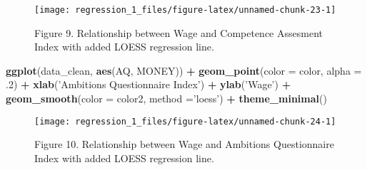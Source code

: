 \documentclass[]{article}
\newenvironment{Shaded}{\begin{snugshade}}{\end{snugshade}}
\newcommand{\DataTypeTok}[1]{\textcolor[rgb]{0.13,0.29,0.53}{#1}}
\newcommand{\FloatTok}[1]{\textcolor[rgb]{0.00,0.00,0.81}{#1}}
\newcommand{\KeywordTok}[1]{\textcolor[rgb]{0.13,0.29,0.53}{\textbf{#1}}}
\newcommand{\NormalTok}[1]{#1}
\newcommand{\OperatorTok}[1]{\textcolor[rgb]{0.81,0.36,0.00}{\textbf{#1}}}
\newcommand{\StringTok}[1]{\textcolor[rgb]{0.31,0.60,0.02}{#1}}
\begin{document}
\begin{figure}

{\centering \texttt{[image: regression\_1\_files/figure-latex/unnamed-chunk-23-1]} 

}

\caption{Figure 9. Relationship between Wage and Competence Assesment Index with added LOESS regression line.}\label{fig:unnamed-chunk-23}
\end{figure}

\begin{Shaded}
\begin{Highlighting}[]
\KeywordTok{ggplot}\NormalTok{(data_clean, }\KeywordTok{aes}\NormalTok{(AQ, MONEY)) }\OperatorTok{+}\StringTok{ }\KeywordTok{geom_point}\NormalTok{(}\DataTypeTok{color =}\NormalTok{ color, }
                                          \DataTypeTok{alpha =} \FloatTok{.2}\NormalTok{) }\OperatorTok{+}\StringTok{ }
\StringTok{                               }\KeywordTok{xlab}\NormalTok{(}\StringTok{'Ambitions Questionnaire Index'}\NormalTok{) }\OperatorTok{+}\StringTok{ }
\StringTok{                               }\KeywordTok{ylab}\NormalTok{(}\StringTok{'Wage'}\NormalTok{) }\OperatorTok{+}\StringTok{ }
\StringTok{                               }\KeywordTok{geom_smooth}\NormalTok{(}\DataTypeTok{color  =}\NormalTok{ color2, }
                                           \DataTypeTok{method =}\StringTok{'loess'}\NormalTok{) }\OperatorTok{+}\StringTok{ }
\StringTok{                               }\KeywordTok{theme_minimal}\NormalTok{()}
\end{Highlighting}
\end{Shaded}

\begin{figure}

{\centering \texttt{[image: regression\_1\_files/figure-latex/unnamed-chunk-24-1]} 

}

\caption{Figure 10. Relationship between Wage and Ambitions Questionnaire Index with added LOESS regression line.}\label{fig:unnamed-chunk-24}
\end{figure}
\end{document}
